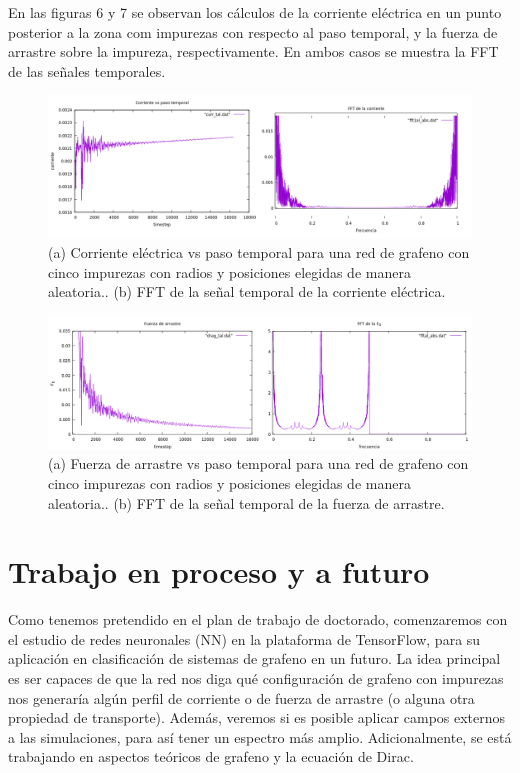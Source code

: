 \documentclass{article}
\begin{document}
  En las figuras 6 y 7 se observan los cálculos de la corriente eléctrica en un punto posterior a la zona com impurezas con respecto al paso temporal, y la fuerza de arrastre sobre la impureza, respectivamente. En ambos casos se muestra la FFT de las señales temporales.
  \begin{figure}[th!]
   \includegraphics[width=1.1\columnwidth]{corr_aleat.png}   \caption{(a) Corriente eléctrica vs paso temporal para una red de grafeno con cinco impurezas con radios y posiciones elegidas de manera aleatoria.. (b) FFT de la señal temporal de la corriente eléctrica.}
\end{figure}
\begin{figure}[th!]
   \includegraphics[width=1.1\columnwidth]{F_Dal.png}   \caption{(a) Fuerza de arrastre vs paso temporal para una red de grafeno con cinco impurezas con radios y posiciones elegidas de manera aleatoria.. (b) FFT de la señal temporal de la fuerza de arrastre.}
\end{figure}
 
 \section{Trabajo en proceso y a futuro}
Como tenemos pretendido en el plan de trabajo de doctorado, comenzaremos con el estudio de redes neuronales (NN) en la plataforma de TensorFlow, para su aplicación en clasificación de sistemas de grafeno en un futuro. La idea principal es ser capaces de que la red nos diga qué configuración de grafeno con impurezas nos generaría algún perfil de corriente o de fuerza de arrastre (o alguna otra propiedad de transporte). Además, veremos si es posible aplicar campos externos a las simulaciones, para así tener un espectro más amplio. Adicionalmente, se está trabajando en aspectos teóricos de grafeno y la ecuación de Dirac.
\end{document}
